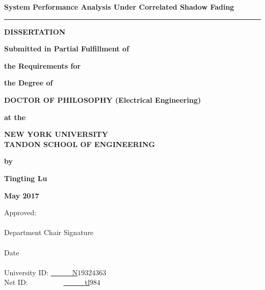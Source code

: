 \newpage
{}\baselineskip
\thispagestyle{empty}
\begin{center}
{\bf \small System Performance Analysis Under Correlated Shadow Fading} %
 \vspace{0.1in}

\rule{2in}{0.01in}

\vspace{0.15in}

{\bf DISSERTATION}

\vspace{0.2in}

{\small \bf Submitted in Partial Fulfillment of}
\vspace{0.03in}

{\small \bf the Requirements for}
\vspace{0.03in}

{\small \bf the Degree of} \vspace{0.3in}

{\bf DOCTOR OF PHILOSOPHY (Electrical Engineering)}

\vspace{0.2in}
{\small \bf at the}
\vspace{0.1in}

{\bf NEW YORK UNIVERSITY\\
TANDON SCHOOL OF ENGINEERING} 
\vspace{0.1in}

{\small \bf by}
\vspace{0.2in}

{\bf Tingting Lu} 
\vspace{0.1in}

{\bf May 2017}
\end{center}

 \vspace{0.3in} 
 \noindent
 \makebox[3.5in]{ } {Approved:} \vspace{0.30in} \\
 \baselineskip
 \makebox[3.5in]{ } \hrulefill  \vspace{0.05in} \\
 \makebox[3.6in]{ } Department Chair Signature \vspace{0.3in} \\
 \makebox[3.5in]{ } \hrulefill \vspace{0.02in} \\
 \makebox[4.3in]{ } Date \vspace{0.1in} \\\\
University ID:   \underline{~~~~~~N$19324363\ \ \ \ \ \ \ \ $} \\
Net ID:~~~~~~~~~~\underline{~~~~~~tl$984\ \ \ \ \ \ \ \ \ \ \ \ \ \ \ \ $} 

